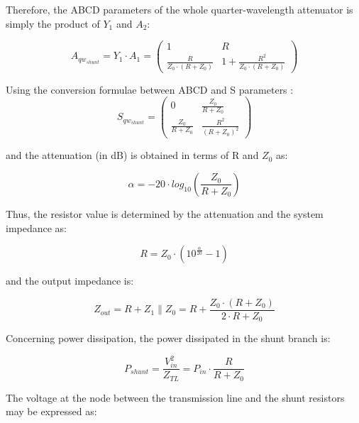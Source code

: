 \noindent Therefore, the ABCD parameters of the whole quarter-wavelength attenuator is simply the product of $Y_1$ and $A_2$:

\begin{equation}
    A_{qw_{shunt}} = Y_1 \cdot A_1 = \begin{pmatrix}
        1 & R\\
        \frac{R}{Z_0 \cdot(R+Z_0)}  & 1 + \frac{R^2}{Z_0 \cdot(R+Z_0)}
    \end{pmatrix}
\end{equation}

\noindent Using the conversion formulae between ABCD and S parameters \cite{pozar2012microwave}:
\begin{equation}
    S_{qw_{shunt}} = \begin{pmatrix}
        0 & \frac{Z_0}{R + Z_0}\\
        \frac{Z_0}{R+Z_0}  & \frac{R^2}{(R+Z_0)^2}
    \end{pmatrix}
\end{equation}

\noindent and the attenuation (in dB) is obtained in terms of R and $Z_0$ as:

\begin{equation}
    \alpha = -20 \cdot log_{10} \left( \frac{Z_0}{R + Z_0}\right)
\end{equation}

\noindent Thus, the resistor value is determined by the attenuation and the system impedance as:

\begin{equation}
    R = Z_0 \cdot \left( 10^{\frac{\alpha}{20}} - 1 \right)
\end{equation}

\noindent and the output impedance is:

\begin{equation}
    Z_{out} = R + Z_1 \parallel Z_0 = R + \frac{Z_0 \cdot (R + Z_0)}{2 \cdot R + Z_0}
\end{equation}

\noindent Concerning power dissipation, the power dissipated in the shunt branch is:

\begin{equation}
    P_{shunt} = \frac{V_{in}^2}{Z_{TL}} = P_{in} \cdot \frac{R}{R+Z_0}
\end{equation}

\noindent The voltage at the node between the transmission line and the shunt resistors may be expressed as:

